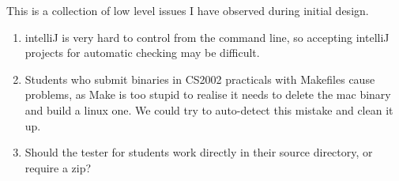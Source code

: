 \documentclass[11pt]{article}
\begin{document}
This is a collection of low level issues I have observed during initial design.

\begin{enumerate}
\item intelliJ is very hard to control from the command line, so accepting intelliJ projects for automatic checking may be difficult.
\item Students who submit binaries in CS2002 practicals with Makefiles cause problems, as Make is too stupid to realise it needs to delete the mac binary and build a linux one. We could try to auto-detect this mistake and clean it up.
\item Should the tester for students work directly in their source directory, or require a zip?
\end{enumerate}
\end{document}
